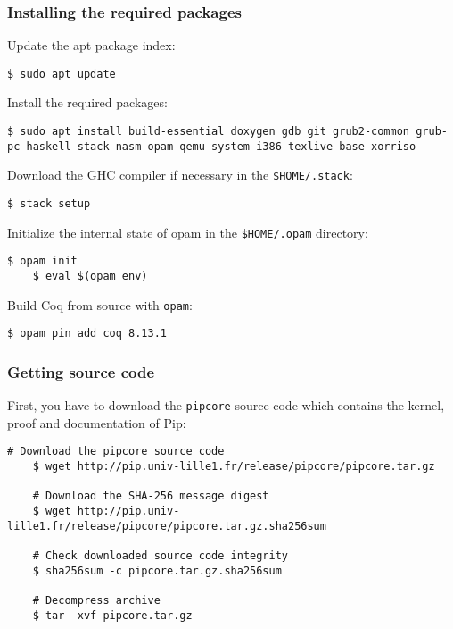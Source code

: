 \documentclass[10pt,a4paper,titlepage]{refart}
\begin{document}
\subsubsection{Installing the required packages}

Update the apt package index:

\begin{lstlisting}[style=BashStyle]
    $ sudo apt update
\end{lstlisting}

Install the required packages:

\begin{lstlisting}[style=BashStyle]
    $ sudo apt install build-essential doxygen gdb git grub2-common grub-pc haskell-stack nasm opam qemu-system-i386 texlive-base xorriso
\end{lstlisting}

Download the GHC compiler if necessary in the \texttt{\$HOME/.stack}:

\begin{lstlisting}[style=BashStyle]
    $ stack setup
\end{lstlisting}

Initialize the internal state of opam in the \texttt{\$HOME/.opam} directory:

\begin{lstlisting}[style=BashStyle]
    $ opam init
    $ eval $(opam env)
\end{lstlisting}

Build Coq from source with \texttt{opam}:

\begin{lstlisting}[style=BashStyle]
    $ opam pin add coq 8.13.1
\end{lstlisting}

\subsubsection{Getting source code}

First, you have to download the \texttt{pipcore} source code which contains the
kernel, proof and documentation of Pip:

\begin{lstlisting}[style=BashStyle]
    # Download the pipcore source code
    $ wget http://pip.univ-lille1.fr/release/pipcore/pipcore.tar.gz

    # Download the SHA-256 message digest
    $ wget http://pip.univ-lille1.fr/release/pipcore/pipcore.tar.gz.sha256sum

    # Check downloaded source code integrity
    $ sha256sum -c pipcore.tar.gz.sha256sum

    # Decompress archive
    $ tar -xvf pipcore.tar.gz
\end{lstlisting}
\end{document}
